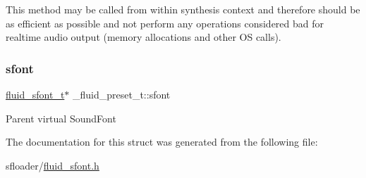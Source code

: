 This method may be called from within synthesis context and therefore should be as efficient as possible and not perform any operations considered bad for realtime audio output (memory allocations and other OS calls). \mbox{\label{struct__fluid__preset__t_a88abb2db089ec85c8793fadf6c6e12c3}} 
\subsubsection{\texorpdfstring{sfont}{sfont}}
{\footnotesize\ttfamily \hyperlink{types_8h_aa6c18288f76608acbb10b80a153f4ab8}{fluid\+\_\+sfont\+\_\+t}$\ast$ \+\_\+fluid\+\_\+preset\+\_\+t\+::sfont}

Parent virtual Sound\+Font 

The documentation for this struct was generated from the following file\+:\begin{DoxyCompactItemize}
\item 
sfloader/\hyperlink{fluid__sfont_8h}{fluid\+\_\+sfont.\+h}\end{DoxyCompactItemize}
